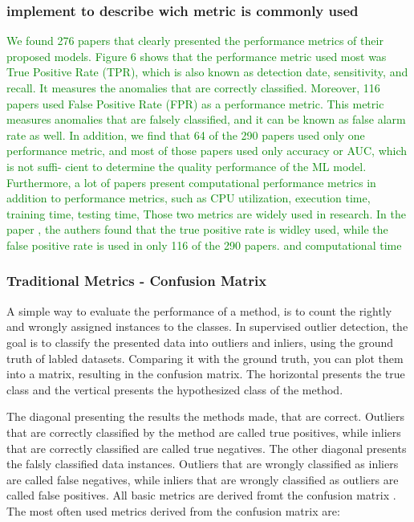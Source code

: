 \subsubsection{implement to describe wich metric is commonly used}
\textcolor{green}
{We found 276 papers that clearly
presented the performance metrics of their proposed models.
Figure 6 shows that the performance metric used most was
True Positive Rate (TPR), which is also known as detection
date, sensitivity, and recall. It measures the anomalies that are
correctly classified. Moreover, 116 papers used False Positive
Rate (FPR) as a performance metric. This metric measures
anomalies that are falsely classified, and it can be known
as false alarm rate as well.  In addition, we find that 64 of the
290 papers used only one performance metric, and most of
those papers used only accuracy or AUC, which is not suffi-
cient to determine the quality performance of the ML model.
Furthermore, a lot of papers present computational
performance metrics in addition to performance metrics, such
as CPU utilization, execution time, training time, testing time,
Those two metrics are widely used in research. 
In the paper \citep[postfix]{nassif2021}, the authers found that the true positive rate is widley used, while the false positive rate is used in only 116 of the 290 papers.
and computational time \citep[postfix]{nassif2021}}


\subsubsection{Traditional Metrics - Confusion Matrix}
A simple way to evaluate the performance of a method, is to count the rightly and wrongly assigned instances to the classes.
In supervised outlier detection, the goal is to classify the presented data into outliers and inliers, using the ground truth of labled datasets.
Comparing it with the ground truth, you can plot them into a matrix, resulting in the confusion matrix.
The horizontal presents the true class and the vertical presents the hypothesized class of the method.

%

The diagonal presenting the results the methods made, that are correct.
Outliers that are correctly classified by the method are called true positives, while inliers that are correctly classified are called true negatives.
The other diagonal presents the falsly classified data instances.
Outliers that are wrongly classified as inliers are called false negatives, while inliers that are wrongly classified as outliers are called false positives.
All basic metrics are derived fromt the confusion matrix \citep[p.4]{saito2015precision}. 
The most often used metrics derived from the confusion matrix are:

